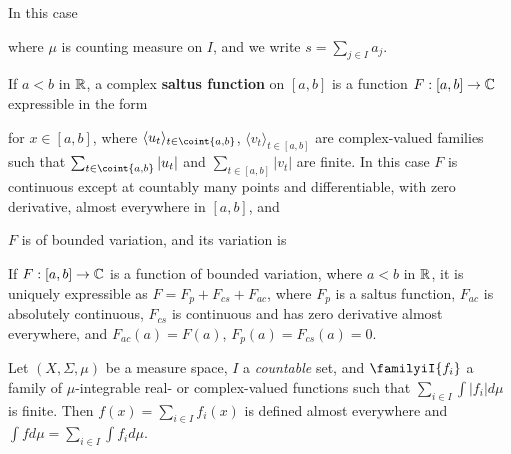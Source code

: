 \noindent In this case


\noindent where $\mu$ is counting measure on $I$, and we write
$s=\sum_{j\in I}a_j$.

 If $a<b$ in $\Bbb R$, a complex {\bf saltus
function} on $[a,b]$ is a function $F:[a,b]\to\Bbb C$ expressible in the
form


\noindent for $x\in [a,b]$, where $\langle
u_t\rangle_{t\in\coint{a,b}}$,
$\langle v_t\rangle_{t\in[a,b]}$ are complex-valued families such that
$\sum_{t\in\coint{a,b}}|u_t|$ and
$\sum_{t\in[a,b]}|v_t|$ are finite.   In this case $F$ is
continuous except at countably many points and differentiable, with zero
derivative, almost everywhere in $[a,b]$, and



\noindent{}$F$ is of bounded variation, and its variation is



 If $F:[a,b]\to\Bbb C$ is a function of bounded
variation, where $a<b$ in $\Bbb R$, it is uniquely expressible as
$F=F_p+F_{cs}+F_{ac}$, where $F_p$ is a saltus function, $F_{ac}$ is
absolutely continuous, $F_{cs}$ is continuous and has zero derivative
almost everywhere, and $F_{ac}(a)=F(a)$, $F_p(a)=F_{cs}(a)=0$.

 Let $(X,\Sigma,\mu)$ be a measure space, $I$
a {\it countable} set, and $\familyiI{f_i}$ a family of $\mu$-integrable
real- or complex-valued functions such that $\sum_{i\in I}\int|f_i|d\mu$
is finite.   Then
$f(x)=\sum_{i\in I}f_i(x)$ is defined almost everywhere and
$\int fd\mu=\sum_{i\in I}\int f_id\mu$.

